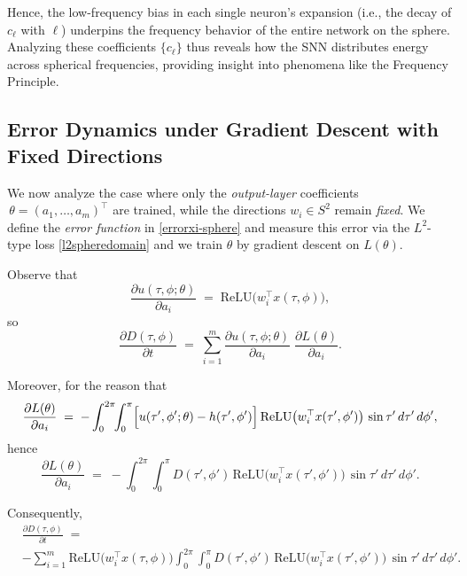 \documentclass[review,onefignum,onetabnum,onealgnum]{siamart250106}
\numberwithin{theorem}{section}
\begin{document}
Hence, the low-frequency bias in each single neuron’s expansion (i.e., the decay of \(c_{\ell}\) with \(\ell\)) underpins the frequency behavior of the entire network on the sphere.  Analyzing these coefficients \(\{c_{\ell}\}\) thus reveals how the SNN distributes energy across spherical frequencies, providing insight into phenomena like the Frequency Principle.


\subsection{Error Dynamics under Gradient Descent with Fixed Directions}
\label{Sec:ErrorEvolution}

We now analyze the case where only the \emph{output-layer} coefficients 
\(\,\theta=(a_1,\dots,a_m)^\top\) are trained, while the directions \(w_i\in S^2\) remain 
\emph{fixed}.  
We define the \emph{error function} in \eqref{errorxi-sphere} and measure this error via the \(L^2\)-type loss \eqref{l2spheredomain} and we train \(\theta\) by gradient descent on \(L(\theta)\).


Observe that
\[
\frac{\partial u(\tau,\phi;\theta)}{\partial a_i}
\;=\;
\mathrm{ReLU}\bigl(w_i^\top x(\tau,\phi)\bigr),
\]
so 
\[
\frac{\partial D(\tau,\phi)}{\partial t}
\;=\;
\sum_{i=1}^m
\frac{\partial u(\tau,\phi;\theta)}{\partial a_i}
\;\frac{\partial L(\theta)}{\partial a_i}.
\]

Moreover, for the reason that
\[
\frac{\partial L(\theta)}{\partial a_i}
\;=\;
-\int_{0}^{2\pi}\!\!\int_{0}^{\pi}
\Bigl[u(\tau',\phi';\theta)-h(\tau',\phi')\Bigr]\,
\mathrm{ReLU}\bigl(w_i^\top x(\tau',\phi')\bigr)
\,\sin\tau'\,d\tau'\,d\phi',
\]
hence
\[
 \frac{\partial L(\theta)}{\partial a_i}
\;=\;
-\int_{0}^{2\pi}\!\!\int_{0}^{\pi}
D(\tau',\phi')\,
\mathrm{ReLU}\bigl(w_i^\top x(\tau',\phi')\bigr)
\,\sin\tau'\,d\tau'\,d\phi'.
\]

Consequently,
\begin{equation}\label{DupdateFixedDirPolar}
\begin{aligned}
&\frac{\partial D(\tau,\phi)}{\partial t}
\;=\;\\
& -\sum_{i=1}^m
\mathrm{ReLU}\bigl(w_i^\top x(\tau,\phi)\bigr)
\int_{0}^{2\pi}\!\!\int_{0}^{\pi}
D(\tau',\phi')\,\mathrm{ReLU}\bigl(w_i^\top x(\tau',\phi')\bigr)
\,\sin\tau'\,d\tau'\,d\phi'.
\end{aligned}
\end{equation}
\end{document}
